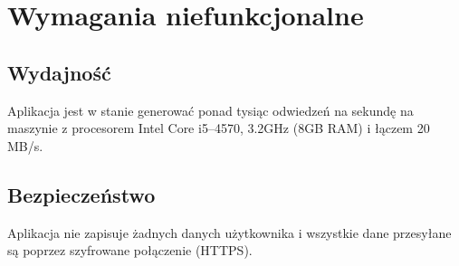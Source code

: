 \documentclass{article}
\begin{document}
\section{Wymagania niefunkcjonalne}

\subsection{Wydajność}
Aplikacja jest w stanie generować ponad tysiąc odwiedzeń na sekundę na maszynie z procesorem Intel Core i5--4570, 3.2GHz (8GB RAM) i łączem 20 MB/s.

\subsection{Bezpieczeństwo}
Aplikacja nie zapisuje żadnych danych użytkownika i wszystkie dane przesyłane są poprzez szyfrowane połączenie (HTTPS).
\end{document}
